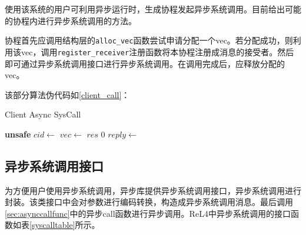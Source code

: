 使用该系统的用户可利用异步运行时，生成协程发起异步系统调用。目前给出可能的协程内进行异步系统调用的方法。

协程首先应调用结构层的\texttt{alloc\_vec}函数尝试申请分配一个vec。若分配成功，则利用该vec，调用\texttt{register\_receiver}注册函数将本协程注册成消息的接受者。然后即可通过异步系统调用接口进行异步系统调用。在调用完成后，应释放分配的vec。

该部分算法伪代码如\ref{client_call}：

\begin{algorithm}
  \caption{Client Async SysCall}\label{alg:client_call}
  \begin{algorithmic}
    \State \textbf{unsafe}
    \State $cid \gets$ 
    \State $vec \gets$
    \State {}
    \State $res$
    \Else
    \State $0$
    \EndIf
    \State $reply \gets$  
    \State {}
    \Else
    \State {}
    \EndIf
    \EndFor
    \State {}
    \EndProcedure
  \end{algorithmic}
\end{algorithm}


\subsection{异步系统调用接口}

为方便用户使用异步系统调用，异步库提供异步系统调用接口，异步系统调用进行封装。该类接口中会对参数进行编码转换，构造成异步系统调用消息。最后调用\ref{sec:asynccallfunc}中的异步call函数进行异步调用。ReL4中异步系统调用的接口函数如表\ref{syscalltable}所示。


